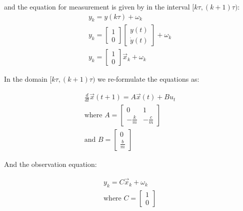 \documentclass[12pt]{article}
\begin{document}
and the equation for measurement is given by in the interval $[k\tau, (k+1)\tau)$:
\begin{eqnarray*}
y_k = y(k\tau) + \omega_k\\
y_k = \begin{bmatrix} 1 \\ 0\end{bmatrix}  \begin{bmatrix} y(t) \\ \dot{y}(t) \end{bmatrix} + \omega_k \\
y_k = \begin{bmatrix} 1 \\ 0\end{bmatrix} \vec{x}_k + \omega_k
\end{eqnarray*}

In the domain $[k\tau, (k+1)\tau)$ we re-formulate the equations as:

\begin{eqnarray*}
\frac{d}{dt}\vec{x}(t+1) = A\vec{x}(t) + Bu_t\\
\text{where } A = \begin{bmatrix} 0 & 1\\ -\frac{k}{m} & -\frac{c}{m}\end{bmatrix}\\
\text{and } B = \begin{bmatrix} 0 \\ \frac{b}{m} \end{bmatrix} 
\end{eqnarray*}

And the observation equation:

\begin{eqnarray*}
y_k = C \vec{x}_k + \omega_k\\
\text{where } C = \begin{bmatrix} 1 \\ 0\end{bmatrix} 
\end{eqnarray*}
\end{document}
